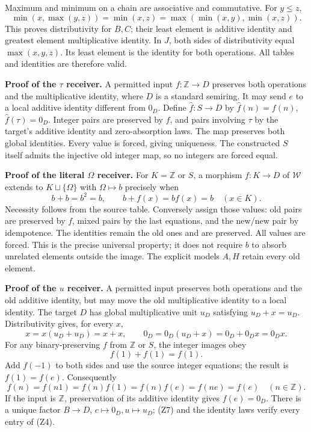 \documentclass[
]{article}
\begin{document}
Maximum and minimum on a chain are associative and commutative. For
\(y\le z\), \[
\min(x,\max(y,z))=\min(x,z)
=\max(\min(x,y),\min(x,z)).
\] This proves distributivity for \(B,C\); their least element is
additive identity and greatest element multiplicative identity. In
\(J\), both sides of distributivity equal \(\max(x,y,z)\). Its least
element is the identity for both operations. All tables and identities
are therefore valid.

\textbf{Proof of the \(\tau\) receiver.} A permitted input
\(f:\mathbb Z\to D\) preserves both operations and the multiplicative
identity, where \(D\) is a standard semiring. It may send \(e\) to a
local additive identity different from \(0_D\). Define
\(\widehat f:S\to D\) by \(\widehat f(n)=f(n)\),
\(\widehat f(\tau)=0_D\). Integer pairs are preserved by \(f\), and
pairs involving \(\tau\) by the target's additive identity and
zero-absorption laws. The map preserves both global identities. Every
value is forced, giving uniqueness. The constructed \(S\) itself admits
the injective old integer map, so no integers are forced equal.

\textbf{Proof of the literal \(\Omega\) receiver.} For \(K=\mathbb Z\)
or \(S\), a morphism \(f:K\to D\) of \(\mathcal W\) extends to
\(K\sqcup\{\Omega\}\) with \(\Omega\mapsto b\) precisely when \[
b+b=b^2=b,\qquad b+f(x)=bf(x)=b\quad(x\in K).
\tag{Z6}
\] Necessity follows from the source table. Conversely assign those
values: old pairs are preserved by \(f\), mixed pairs by the last
equations, and the new/new pair by idempotence. The identities remain
the old ones and are preserved. All values are forced. This is the
precise universal property; it does not require \(b\) to absorb
unrelated elements outside the image. The explicit models \(A,H\) retain
every old element.

\textbf{Proof of the \(u\) receiver.} A permitted input preserves both
operations and the old additive identity, but may move the old
multiplicative identity to a local identity. The target \(D\) has global
multiplicative unit \(u_D\) satisfying \(u_D+x=u_D\). Distributivity
gives, for every \(x\), \[
x=x(u_D+u_D)=x+x,\qquad
0_D=0_D(u_D+x)=0_D+0_Dx=0_Dx.
\tag{Z7}
\] For any binary-preserving \(f\) from \(\mathbb Z\) or \(S\), the
integer images obey \[
f(1)+f(1)=f(1).
\] Add \(f(-1)\) to both sides and use the source integer equations; the
result is \(f(1)=f(e)\). Consequently \[
f(n)=f(n1)=f(n)f(1)=f(n)f(e)=f(ne)=f(e)
\quad(n\in\mathbb Z).
\tag{Z8}
\] If the input is \(\mathbb Z\), preservation of its additive identity
gives \(f(e)=0_D\). There is a unique factor \(B\to D\),
\(c\mapsto0_D,u\mapsto u_D\); (Z7) and the identity laws verify every
entry of (Z4).
\end{document}
